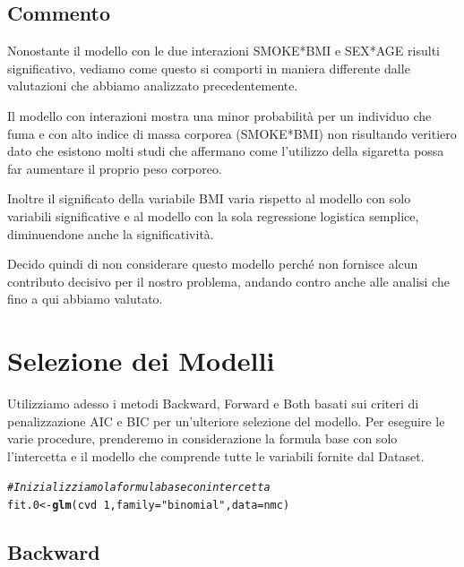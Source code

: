 \documentclass{article}\usepackage[]{graphicx}\usepackage[]{xcolor}
\makeatletter
\newcommand{\hlnum}[1]{\textcolor[rgb]{0.686,0.059,0.569}{#1}}%
\newcommand{\hlstr}[1]{\textcolor[rgb]{0.192,0.494,0.8}{#1}}%
\newcommand{\hlcom}[1]{\textcolor[rgb]{0.678,0.584,0.686}{\textit{#1}}}%
\newcommand{\hlopt}[1]{\textcolor[rgb]{0,0,0}{#1}}%
\newcommand{\hlstd}[1]{\textcolor[rgb]{0.345,0.345,0.345}{#1}}%
\newcommand{\hlkwb}[1]{\textcolor[rgb]{0.69,0.353,0.396}{#1}}%
\newcommand{\hlkwc}[1]{\textcolor[rgb]{0.333,0.667,0.333}{#1}}%
\newcommand{\hlkwd}[1]{\textcolor[rgb]{0.737,0.353,0.396}{\textbf{#1}}}%
\newenvironment{kframe}{%
 \def\at@end@of@kframe{}%
 \ifinner\ifhmode%
  \def\at@end@of@kframe{\end{minipage}}%
  \begin{minipage}{\columnwidth}%
 \fi\fi%
 \def\FrameCommand##1{\hskip\@totalleftmargin \hskip-\fboxsep
 \colorbox{shadecolor}{##1}\hskip-\fboxsep
     \hskip-\linewidth \hskip-\@totalleftmargin \hskip\columnwidth}%
 \MakeFramed {\advance\hsize-\width
   \@totalleftmargin\z@ \linewidth\hsize
   \@setminipage}}%
 {\par\unskip\endMakeFramed%
 \at@end@of@kframe}
\newenvironment{knitrout}{}{} %
\makeatother
\begin{document}
  \subsection{Commento}
    Nonostante il modello con le due interazioni SMOKE*BMI e SEX*AGE risulti
    significativo, vediamo come questo si comporti in maniera differente dalle
    valutazioni che abbiamo analizzato precedentemente.\par
    Il modello con interazioni mostra una minor probabilità per un individuo che
    fuma e con alto indice di massa corporea (SMOKE*BMI) non risultando 
    veritiero dato che esistono molti studi che affermano come l'utilizzo della 
    sigaretta possa far aumentare il proprio peso corporeo.\par
    Inoltre il significato della variabile BMI varia rispetto al modello con 
    solo variabili significative e al modello con la sola regressione logistica 
    semplice, diminuendone anche la significatività. \par
    Decido quindi di non considerare questo modello perché non fornisce alcun 
    contributo decisivo per il nostro problema, andando contro anche alle 
    analisi che fino a qui abbiamo valutato.
    
\clearpage


\section{Selezione dei Modelli}
  Utilizziamo adesso i metodi Backward, Forward e Both basati sui criteri di 
  penalizzazione AIC e BIC per un'ulteriore selezione del modello.
  Per eseguire le varie procedure, prenderemo in considerazione la formula base 
  con solo l'intercetta e il modello che comprende tutte le variabili fornite 
  dal Dataset.
  
\begin{knitrout}
\color{fgcolor}\begin{kframe}
\begin{alltt}
\hlcom{#Inizializziamo la formula base con intercetta}
\hlstd{fit.0} \hlkwb{<-} \hlkwd{glm}\hlstd{(cvd}\hlopt{~}\hlnum{1}\hlstd{,} \hlkwc{family}\hlstd{=}\hlstr{"binomial"}\hlstd{,} \hlkwc{data}\hlstd{=nmc)}
\end{alltt}
\end{kframe}
\end{knitrout}

   \subsection{Backward}
\end{document}
